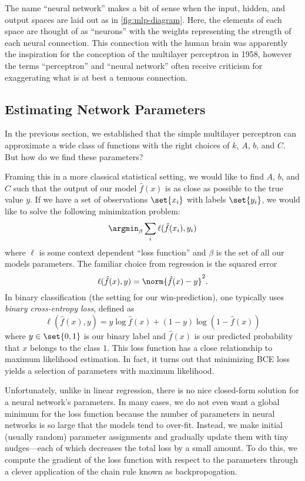The name ``neural network'' makes a bit of sense when the input, hidden, and output spaces are laid out as in \autoref{fig:mlp-diagram}. Here, the elements of each space are thought of as ``neurons'' with the weights representing the strength of each neural connection.
This connection with the human brain was apparently the inspiration for the conception of the multilayer perceptron in 1958, however the terms ``perceptron'' and ``neural network'' often receive criticism for exaggerating what is at best a tenuous connection.

\subsection{Estimating Network Parameters}

In the previous section, we established that the simple multilayer perceptron can approximate a wide class of functions with the right choices of $k$, $A$, $b$, and $C$. But how do we find these parameters?

Framing this in a more classical statistical setting, we would like to find $A$, $b$, and $C$ such that the output of our model $\hat f(x)$ is as close as possible to the true value $y$. If we have a set of observations $\set{x_i}$ with labels $\set{y_i}$, we would like to solve the following minimization problem:
\begin{equation*}
	\argmin_\beta \sum_i \ell(\hat f(x_i), y_i)
\end{equation*}
where $\ell$ is some context dependent ``loss function'' and $\beta$ is the set of all our models parameters. The familiar choice from regression is the squared error
\begin{equation}
	\ell(\hat f(x), y) = \norm{\hat f(x) - y}^2.
\end{equation}
In binary classification (the setting for our win-prediction), one typically uses \emph{binary cross-entropy loss}, defined as
\begin{equation}
	\label{eqn:bce-loss}
	\ell(\hat f(x), y) = y \log \hat f(x) + (1 - y) \log (1 - \hat f(x))
\end{equation}
where $y \in \set{0, 1}$ is our binary label and $\hat f(x)$ is our predicted probability that $x$ belongs to the class $1$.
This loss function has a close relationship to maximum likelihood estimation. In fact, it turns out that minimizing BCE loss yields a selection of parameters with maximum likelihood.

Unfortunately, unlike in linear regression, there is no nice closed-form solution for a neural network's parameters.
In many cases, we do not even want a global minimum for the loss function because the number of parameters in neural networks is so large that the models tend to over-fit.
Instead, we make initial (usually random) parameter assignments and gradually update them with tiny nudges---each of which decreases the total loss by a small amount.
To do this, we compute the gradient of the loss function with respect to the parameters through a clever application of the chain rule known as backpropogation.

